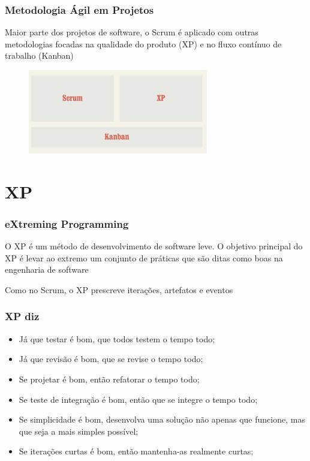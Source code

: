 \begin{frame}
 \frametitle{Metodologia Ágil em Projetos}
  \begin{block}{}
 Maior parte dos projetos de software, o Scrum é aplicado com outras metodologias focadas na qualidade do produto (XP) e no fluxo contínuo de trabalho (Kanban)
 \end{block}

   \begin{figure}
   \centering
   \includegraphics[width = 0.7\textwidth]{figs/cobertura_agil.png}
  \end{figure}
\end{frame}

\section{XP}
\begin{frame}
 \frametitle{eXtreming Programming}
 \begin{block}{}
  O XP é um método de desenvolvimento de software leve.
  O objetivo principal do XP é levar ao extremo um conjunto de práticas que são ditas como boas na engenharia de software
 \end{block}
 \begin{block}{}
  Como no Scrum, o XP prescreve iterações, artefatos e eventos
 \end{block}
\end{frame}

\begin{frame}
 \frametitle{XP diz}
 \begin{itemize}
  \item Já que testar é bom, que todos testem o tempo todo;
  \item Já que revisão é bom, que se revise o tempo todo;
  \item Se projetar é bom, então refatorar o tempo todo;
  \item Se teste de integração é bom, então que se integre o tempo todo;
  \item Se simplicidade é bom, desenvolva uma solução não apenas que funcione, mas que seja a mais simples possível;
  \item Se iterações curtas é bom, então mantenha-as realmente curtas;
 \end{itemize}
\end{frame}

